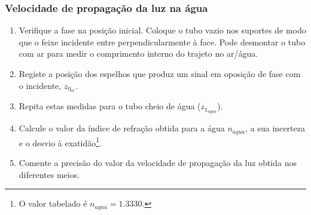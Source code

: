 \documentclass[a4paper,12pt]{article}      %
\begin{document}
\subsubsection{\sf Velocidade de propagação da luz na água}
\begin{enumerate}
\item Verifique a fase na posição inicial. Coloque o tubo vazio  nos suportes de modo que o feixe incidente entre perpendicularmente à face. Pode desmontar o tubo com ar para medir o comprimento interno do trajeto no ar/água.
\item Registe a posição dos espelhos que produz um sinal em oposição de fase com o incidente, $z_{0_{ar}}$. 
\item Repita estas medidas para o tubo cheio de água ($z_{1_{agua}}$). 
\item Calcule o valor da índice de refração obtida para a água $n_{agua}$, a sua incerteza e o desvio à exatidão\footnote{O valor tabelado é $n_{agua}=1.3330$.}. 
\item Comente a precisão do valor da velocidade de propagação da luz obtida nos 
diferentes meios.
\end{enumerate}
\end{document}
